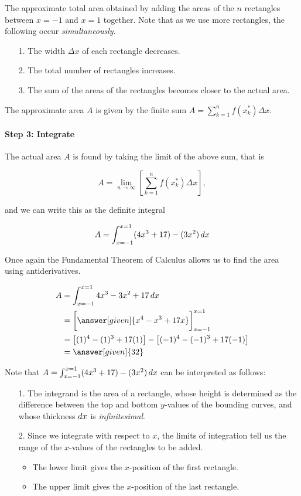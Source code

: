 \documentclass{ximera}
\begin{document}
\begin{example}
The approximate total area obtained by adding the areas of the $n$ rectangles between $x=-1$ and $x=1$ together.  Note that as we use more rectangles, the following occur \emph{simultaneously}.

\begin{itemize}
\item[1.] The width $\Delta x$ of each rectangle decreases.
\item[2.] The total number of rectangles increases.
\item[3.] The sum of the areas of the rectangles becomes closer to the actual area.
\end{itemize}

The approximate area $A$ is given by the finite sum $A = \sum_{k=1}^n f(x_k^*) \Delta x $. 


\paragraph{Step 3: Integrate}

The actual area $A$ is found by taking the limit of the above sum, that is

\[
A = \lim_{n \rightarrow \infty} \left[ \sum_{k=1}^n f(x_k^*) \Delta x \right],
\]

and we can write this as the definite integral

\[
A = \int_{x=-1}^{x=1} (4x^3+17)-(3x^2) \mathop{}\!d x
\]

Once again the Fundamental Theorem of Calculus allows us to find the area using antiderivatives.

\begin{align*}
A &= \int_{x=-1}^{x=1} 4x^3-3x^2+17 \d x \\
&= \eval{ \answer[given]{x^4-x^3+17x}}_{x= -1}^{x=1} \\
&= \left[(1)^4-(1)^3+17(1)\right] -  \left[(-1)^4-(-1)^3+17(-1)\right] \\
&=\answer[given]{32}
\end{align*}


Note that $A = \int_{x=-1}^{x=1} (4x^3+17)-(3x^2) \mathop{}\!d x$ can be interpreted as follows:
\begin{itemize}
\item[1.] The integrand is the area of a rectangle, whose height is determined as the difference between the top and bottom $y$-values of the bounding curves, and whose thickness $\mathop{}\!d x$ is \emph{infinitesimal}. 
\item[2.] Since we integrate with respect to $x$, the limits of integration tell us the range of the $x$-values of the rectangles to be added.
\begin{itemize}
\item The lower limit gives the $x$-position of the first rectangle.
\item The upper limit gives the $x$-position of the last rectangle.
\end{itemize}
\end{itemize}



\end{example}
\end{document}
